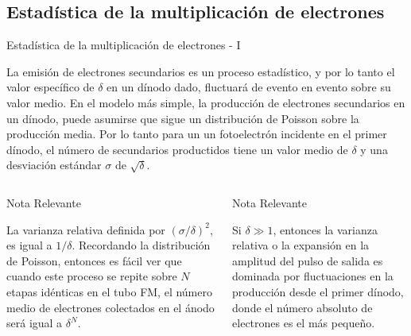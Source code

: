 \documentclass[a4paper,10pt]{beamer}
\begin{document}
\subsection{Estadística de la multiplicación de electrones}
\begin{frame}{Estadística de la multiplicación de electrones - I}

\begin{justify}
 La emisión de electrones secundarios es un proceso estadístico, y por lo tanto el 
 valor específico de $\delta$ en un dínodo dado, fluctuará de evento en evento sobre 
 su valor medio. En el modelo más simple, la producción de electrones secundarios en 
 un dínodo, puede asumirse que sigue un distribución de Poisson sobre la producción media.
 Por lo tanto para un un fotoelectrón incidente en el primer dínodo, el número de 
 secundarios productidos tiene un valor medio de $\delta$ y una desviación estándar 
 $\sigma$ de $\sqrt{\delta}$.
 \end{justify}
 
 \begin{columns}[c]

 \column{2in}
 \begin{block}{Nota Relevante}
 \begin{justify}
 \begin{footnotesize}
 La varianza relativa definida por $(\sigma/\delta)^2$, es igual a $1/\delta$. Recordando 
 la distribución de Poisson, entonces es fácil ver que cuando este proceso se repite 
 sobre $N$ etapas idénticas en el tubo FM, el número medio de electrones colectados en 
 el ánodo será igual a $\delta^N$.
 \end{footnotesize}
 \end{justify}
 \end{block}
 \column{2in}
 \begin{block}{Nota Relevante}
 \begin{justify}
  Si $\delta \gg 1$, entonces la varianza relativa o la expansión en la amplitud 
  del pulso de salida es dominada por fluctuaciones en la producción desde el primer
  dínodo, donde el número absoluto de electrones es el más pequeño.
  \end{justify}
 \end{block}
 \end{columns}

\end{frame}
\end{document}
